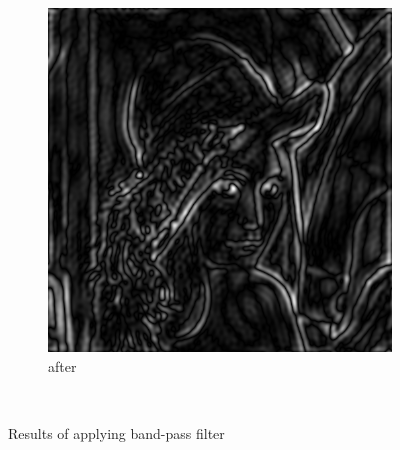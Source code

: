 \documentclass[12pt]{article}
\begin{document}
\begin{figure}[H]
\begin{subfigure}[t]{\subfiguresize}
        \includegraphics[width=\textwidth]{img/lena_bandpass.png}
        \caption{after}
    \end{subfigure}\\[1em]
    \caption{Results of applying band-pass filter}
\end{figure}  
\end{document}
